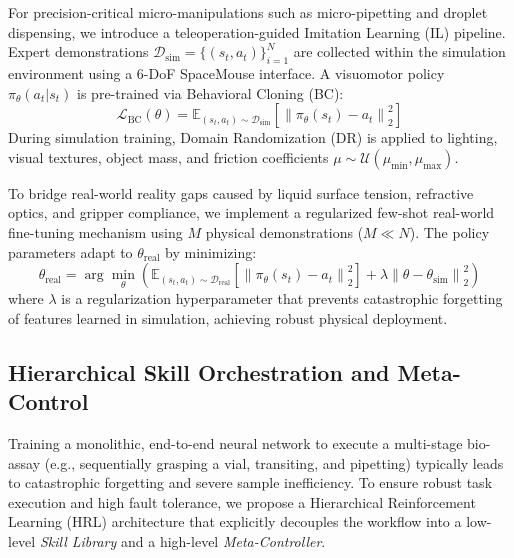 \documentclass[journal,twocolumn]{IEEEtran}
\begin{document}
For precision-critical micro-manipulations such as micro-pipetting and droplet dispensing, we introduce a teleoperation-guided Imitation Learning (IL) pipeline. Expert demonstrations $\mathcal{D}_{\text{sim}} = \{(s_t, a_t)\}_{i=1}^N$ are collected within the simulation environment using a 6-DoF SpaceMouse interface. A visuomotor policy $\pi_\theta(a_t | s_t)$ is pre-trained via Behavioral Cloning (BC):
\begin{equation}
    \mathcal{L}_{\text{BC}}(\theta) = \mathbb{E}_{(s_t, a_t) \sim \mathcal{D}_{\text{sim}}} \left[ \left\| \pi_\theta(s_t) - a_t \right\|_2^2 \right]
\end{equation}
During simulation training, Domain Randomization (DR) is applied to lighting, visual textures, object mass, and friction coefficients $\mu \sim \mathcal{U}(\mu_{\min}, \mu_{\max})$.

To bridge real-world reality gaps caused by liquid surface tension, refractive optics, and gripper compliance, we implement a regularized few-shot real-world fine-tuning mechanism using $M$ physical demonstrations ($M \ll N$). The policy parameters adapt to $\theta_{\text{real}}$ by minimizing:
\begin{equation}
    \theta_{\text{real}} = \arg\min_{\theta} \left( \mathbb{E}_{(s_t, a_t) \sim \mathcal{D}_{\text{real}}} \left[ \left\| \pi_\theta(s_t) - a_t \right\|_2^2 \right] + \lambda \left\| \theta - \theta_{\text{sim}} \right\|_2^2 \right)
\end{equation}
where $\lambda$ is a regularization hyperparameter that prevents catastrophic forgetting of features learned in simulation, achieving robust physical deployment.
\subsection{Hierarchical Skill Orchestration and Meta-Control}
\label{subsec:hierarchical_skill}

Training a monolithic, end-to-end neural network to execute a multi-stage bio-assay (e.g., sequentially grasping a vial, transiting, and pipetting) typically leads to catastrophic forgetting and severe sample inefficiency. To ensure robust task execution and high fault tolerance, we propose a Hierarchical Reinforcement Learning (HRL) architecture that explicitly decouples the workflow into a low-level \textit{Skill Library} and a high-level \textit{Meta-Controller}.
\end{document}
